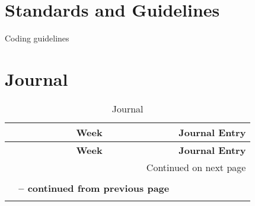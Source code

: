 \chapter{Standards and Guidelines}
Coding guidelines

\chapter{Journal}
\begin{center}
\begin{longtable}{|c|p{12cm}|}

\hline \multicolumn{1}{|c|}{\textbf{Week}} & \multicolumn{1}{c|}{\textbf{Journal Entry}} \\ \hline 
\endfirsthead

\hline \multicolumn{1}{|c|}{\textbf{Week}} &
\multicolumn{1}{c|}{\textbf{Journal Entry}} \\
\endhead

\hline \multicolumn{2}{|r|}{{Continued on next page}} \\ \hline
\caption[Journal]{Journal} \label{table:journal} \\
\endfoot

\multicolumn{2}{c}%
{{\bfseries \tablename\ \thetable{} -- continued from previous page}} \\
\endlastfoot


\end{longtable}
\end{center}
